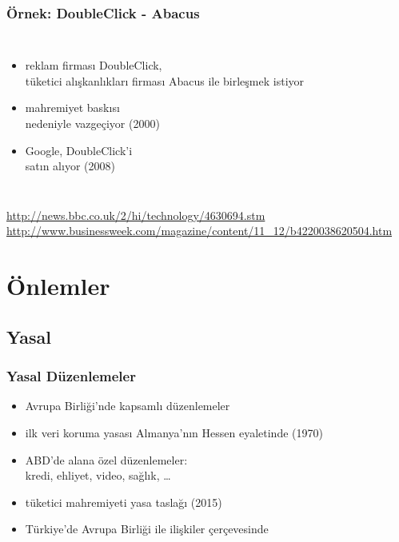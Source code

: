 \documentclass[dvipsnames]{beamer}
\theoremstyle{plain}
\begin{document}
\begin{frame}
  \frametitle{Örnek: DoubleClick - Abacus}

  \begin{columns}

    \begin{itemize}
      \item reklam firması DoubleClick,\\
        tüketici alışkanlıkları firması Abacus
        ile birleşmek istiyor\\
      \item mahremiyet baskısı\\
        nedeniyle vazgeçiyor (2000)

      \pause
      \medskip
      \item Google, DoubleClick'i\\
        satın alıyor (2008)
    \end{itemize}
  \end{columns}

  \medskip
  \tiny{\url{http://news.bbc.co.uk/2/hi/technology/4630694.stm}}\\
  \tiny{\url{http://www.businessweek.com/magazine/content/11_12/b4220038620504.htm}}\\
\end{frame}

\section{Önlemler}

\subsection{Yasal}

\begin{frame}
  \frametitle{Yasal Düzenlemeler}

  \begin{itemize}
    \item Avrupa Birliği'nde kapsamlı düzenlemeler
    \item ilk veri koruma yasası Almanya'nın Hessen eyaletinde (1970)

    \medskip
    \item ABD'de alana özel düzenlemeler:\\
      kredi, ehliyet, video, sağlık, \ldots
    \item tüketici mahremiyeti yasa taslağı (2015)

    \medskip
    \item Türkiye'de Avrupa Birliği ile ilişkiler çerçevesinde
  \end{itemize}
\end{frame}
\end{document}
